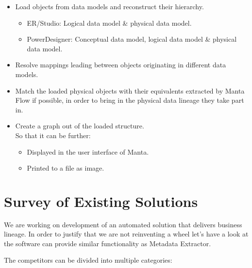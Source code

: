 \begin{itemize}
	\item Load objects from data models and reconstruct their hierarchy.
	\begin{itemize}
		\item ER/Studio: Logical data model \& physical data model.
		\item PowerDesigner:  Conceptual data model, logical data model \& physical data model.
	\end{itemize}
	\item Resolve mappings leading between objects originating in different data models.
	\item Match the loaded physical objects with their equivalents extracted by Manta Flow if possible, in order to bring in the physical data lineage they take part in.
	\item Create a graph out of the loaded structure. \\
	So that it can be further:
	\begin{itemize}
		\item Displayed in the user interface of Manta.
		\item Printed to a file as image.
	\end{itemize}
\end{itemize}


\section{Survey of Existing Solutions}

We are working on development of an automated solution that delivers business lineage.
In order to justify that we are not reinventing a wheel let's have a look at the software can provide similar functionality as Metadata Extractor.

The competitors can be divided into multiple categories:

